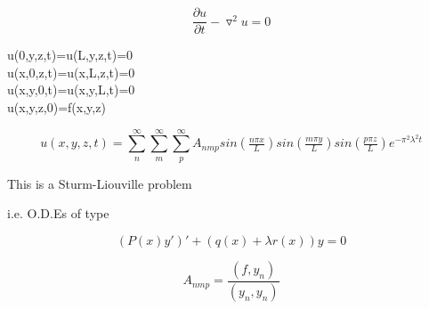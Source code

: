 \documentclass{beamer}
\begin{document}

\section{}

\begin{frame}{}

\begin{equation}
\dfrac{\partial u}{\partial t} - \triangledown^2 u = 0
\end{equation}

u(0,y,z,t)=u(L,y,z,t)=0 \\
u(x,0,z,t)=u(x,L,z,t)=0 \\
u(x,y,0,t)=u(x,y,L,t)=0 \\

u(x,y,z,0)=f(x,y,z)


\begin{equation}
u(x,y,z,t) = \sum_{n}^{\infty}\sum_{m}^{\infty}\sum_{p}^{\infty} A_{nmp}sin(\tfrac{n\pi x}{L})sin(\tfrac{m\pi y}{L})sin(\tfrac{p\pi z}{L})e^{-\pi^2 \lambda^2 t}
\end{equation}

This is a Sturm-Liouville problem

i.e. O.D.Es of type

\begin{equation}
(P(x)y')'+(q(x)+\lambda r(x))y = 0
\end{equation}

\begin{equation}
A_{nmp}=\dfrac{(f,y_n)}{(y_n,y_n)}
\end{equation}

\vskip 1cm

\end{frame}
\end{document}
